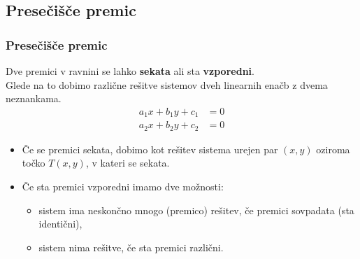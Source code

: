         \begin{frame}

        \end{frame}




    \subsection{Presečišče premic}

        \begin{frame}
            \frametitle{Presečišče premic}

            \begin{block}{}
                Dve premici v ravnini se lahko \textbf{sekata} ali sta \textbf{vzporedni}. \\ 
                Glede na to dobimo različne rešitve sistemov dveh linearnih enačb z dvema neznankama.
                $$\begin{aligned}
                    a_1x+b_1y+c_1&=0 \\ a_2x+b_2y+c_2&=0
                \end{aligned}$$
                
                \begin{itemize}
                    \item Če se premici sekata, dobimo kot rešitev sistema urejen par $(x,y)$ oziroma točko $T(x,y)$, v kateri se sekata.
                    \item Če sta premici vzporedni imamo dve možnosti:
                    \begin{itemize}
                        \item sistem ima neskončno mnogo (premico) rešitev, če premici sovpadata (sta identični),
                        \item sistem nima rešitve, če sta premici različni.
                    \end{itemize}
                \end{itemize}
            \end{block}
        \end{frame}


